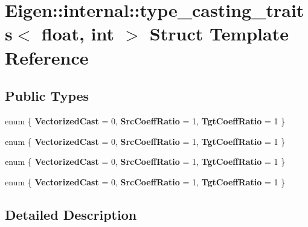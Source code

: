 \hypertarget{struct_eigen_1_1internal_1_1type__casting__traits_3_01float_00_01int_01_4}{}\section{Eigen\+:\+:internal\+:\+:type\+\_\+casting\+\_\+traits$<$ float, int $>$ Struct Template Reference}
\label{struct_eigen_1_1internal_1_1type__casting__traits_3_01float_00_01int_01_4}
\subsection*{Public Types}
\begin{DoxyCompactItemize}
\item 
\mbox{\label{struct_eigen_1_1internal_1_1type__casting__traits_3_01float_00_01int_01_4_ad5380854698a418dfee47c67167316f8}} 
enum \{ {\bfseries Vectorized\+Cast} = 0, 
{\bfseries Src\+Coeff\+Ratio} = 1, 
{\bfseries Tgt\+Coeff\+Ratio} = 1
 \}
\item 
\mbox{\label{struct_eigen_1_1internal_1_1type__casting__traits_3_01float_00_01int_01_4_a8ce2755f27f23ce9c5154c1607ebea9a}} 
enum \{ {\bfseries Vectorized\+Cast} = 0, 
{\bfseries Src\+Coeff\+Ratio} = 1, 
{\bfseries Tgt\+Coeff\+Ratio} = 1
 \}
\item 
\mbox{\label{struct_eigen_1_1internal_1_1type__casting__traits_3_01float_00_01int_01_4_a4f480d5dd0016ca8c4c95f038f786a33}} 
enum \{ {\bfseries Vectorized\+Cast} = 0, 
{\bfseries Src\+Coeff\+Ratio} = 1, 
{\bfseries Tgt\+Coeff\+Ratio} = 1
 \}
\item 
\mbox{\label{struct_eigen_1_1internal_1_1type__casting__traits_3_01float_00_01int_01_4_ad6bf371dc0f943d2a07d990e709178eb}} 
enum \{ {\bfseries Vectorized\+Cast} = 0, 
{\bfseries Src\+Coeff\+Ratio} = 1, 
{\bfseries Tgt\+Coeff\+Ratio} = 1
 \}
\end{DoxyCompactItemize}


\subsection{Detailed Description}
